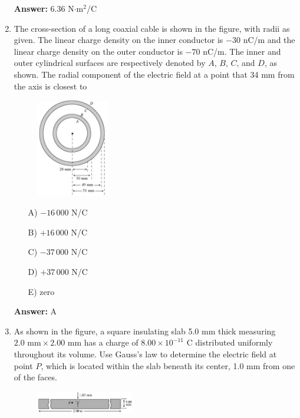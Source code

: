 \begin{enumerate}
    \textbf{Answer:} 6.36 N$\cdot$m$^2$/C

    \item The cross-section of a long coaxial cable is shown in the figure, with radii as given. The linear charge density on the inner conductor is $-30$ nC/m and the linear charge density on the outer conductor is $-70$ nC/m. The inner and outer cylindrical surfaces are respectively denoted by $A$, $B$, $C$, and $D$, as shown. The radial component of the electric field at a point that 34 mm from the axis is closest to

    \begin{figure}[H]
        \centering
        \includegraphics[width=0.3\textwidth]{figures-workshop01/problem-24.png}
    \end{figure}

    \begin{multicols}{5}
    \begin{itemize}
        \item[A)] $-16\,000$ N/C
        \item[B)] $+16\,000$ N/C
        \item[C)] $-37\,000$ N/C
        \item[D)] $+37\,000$ N/C
        \item[E)] zero
    \end{itemize}
    \end{multicols}

    \textbf{Answer:} A

    \item As shown in the figure, a square insulating slab 5.0 mm thick measuring $2.0\text{ mm}\times2.00\text{ mm}$ has a charge of $8.00\times10^{-11}$ C distributed uniformly throughout its volume. Use Gauss's law to determine the electric field at point $P$, which is located within the slab beneath its center, 1.0 mm from one of the faces.

    \begin{figure}[H]
        \centering
        \includegraphics[width=0.4\textwidth]{figures-workshop01/problem-25.png}
    \end{figure}


\end{enumerate}
